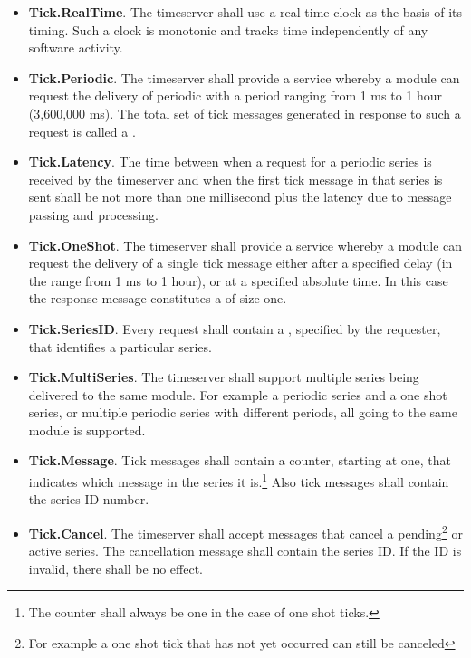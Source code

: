 \begin{itemize}
\item \textbf{Tick.RealTime}. The timeserver shall use a real time clock as the basis of its
  timing. Such a clock is monotonic and tracks time independently of any software activity.
\item \textbf{Tick.Periodic}. The timeserver shall provide a service whereby a module can
  request the delivery of periodic  with a period ranging from 1 ms to 1
  hour (3,600,000 ms). The total set of tick messages generated in response to such a request is
  called a .
\item \textbf{Tick.Latency}. The time between when a request for a periodic series is received
  by the timeserver and when the first tick message in that series is sent shall be not more
  than one millisecond plus the latency due to message passing and processing.
\item \textbf{Tick.OneShot}. The timeserver shall provide a service whereby a module can
  request the delivery of a single tick message either after a specified delay (in the range
  from 1 ms to 1 hour), or at a specified absolute time. In this case the response message
  constitutes a  of size one.
\item \textbf{Tick.SeriesID}. Every request shall contain a , specified by
  the requester, that identifies a particular series.
\item \textbf{Tick.MultiSeries}. The timeserver shall support multiple series being
  delivered to the same module. For example a periodic series and a one shot series, or multiple
  periodic series with different periods, all going to the same module is supported.
\item \textbf{Tick.Message}. Tick messages shall contain a counter, starting at one, that
  indicates which message in the series it is.\footnote{The counter shall always be one in the
  case of one shot ticks.} Also tick messages shall contain the series ID number.
\item \textbf{Tick.Cancel}. The timeserver shall accept messages that cancel a
  pending\footnote{For example a one shot tick that has not yet occurred can still be canceled}
  or active series. The cancellation message shall contain the series ID. If the ID is invalid,
  there shall be no effect. 
\end{itemize}

